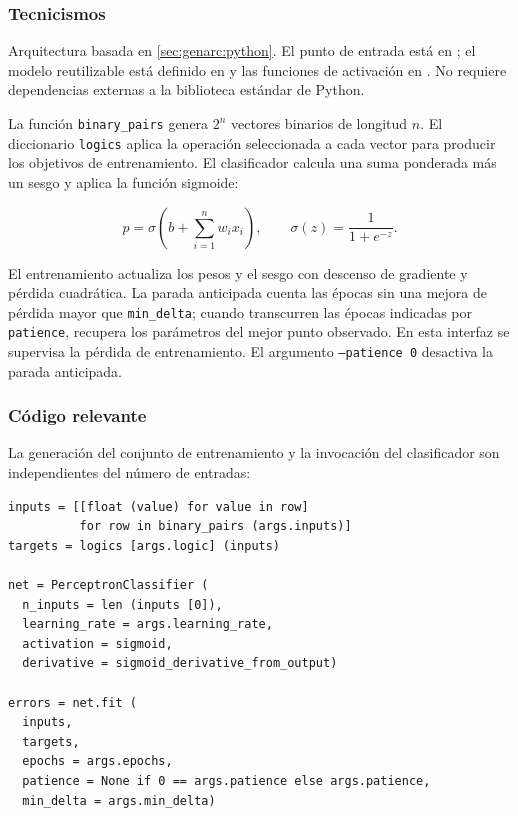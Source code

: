\documentclass{article}[12pt,a4paper]
\begin{document}
\subsubsection{Tecnicismos}

Arquitectura basada en \ref{sec:genarc:python}. El punto de entrada está en
; el modelo reutilizable está definido en
 y las funciones de activación en
. No requiere dependencias externas a la biblioteca
estándar de Python.

La función \texttt{binary_pairs} genera \(2^n\) vectores binarios
de longitud \(n\). El diccionario \texttt{logics} aplica la
operación seleccionada a cada vector para producir los objetivos de
entrenamiento. El clasificador calcula una suma ponderada más un sesgo y aplica
la función sigmoide:

\[
  p = \sigma\!\left(b + \sum_{i=1}^{n} w_i x_i\right),
  \qquad
  \sigma(z) = \frac{1}{1 + e^{-z}}.
\]

El entrenamiento actualiza los pesos y el sesgo con descenso de gradiente y
pérdida cuadrática. La parada anticipada cuenta las épocas sin una mejora de
pérdida mayor que \texttt{min\_delta}; cuando transcurren las épocas indicadas
por \texttt{patience}, recupera los parámetros del mejor punto observado. En
esta interfaz se supervisa la pérdida de entrenamiento. El argumento
\texttt{--patience 0} desactiva la parada anticipada.

\subsubsection{Código relevante}

La generación del conjunto de entrenamiento y la invocación del clasificador
son independientes del número de entradas:

\begin{verbatim}
inputs = [[float (value) for value in row]
          for row in binary_pairs (args.inputs)]
targets = logics [args.logic] (inputs)

net = PerceptronClassifier (
  n_inputs = len (inputs [0]),
  learning_rate = args.learning_rate,
  activation = sigmoid,
  derivative = sigmoid_derivative_from_output)

errors = net.fit (
  inputs,
  targets,
  epochs = args.epochs,
  patience = None if 0 == args.patience else args.patience,
  min_delta = args.min_delta)
\end{verbatim}
\end{document}

